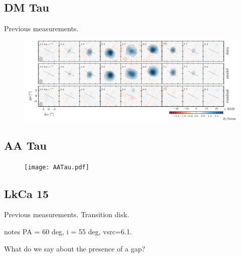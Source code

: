 \documentclass[twocolumn]{aastex6}
\begin{document}

\subsection{DM Tau}
Previous measurements.

\begin{figure}[htb]
\begin{center}
  \includegraphics{DMTau.pdf}
  \end{center}
\end{figure}

\subsection{AA Tau}

\begin{figure}[htb]
\begin{center}
  \texttt{[image: AATau.pdf]}
  \end{center}
\end{figure}

\subsection{LkCa 15}
Previous measurements. Transition disk.

\citep{vandermarel15} notes PA = 60 deg, i = 55 deg,  vsrc=6.1.

What do we say about the presence of a gap?
\end{document}
